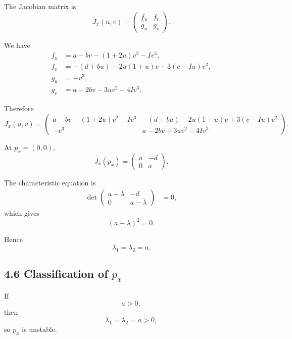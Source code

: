 \documentclass[11pt,a4paper]{article}
\begin{document}
The Jacobian matrix is
\begin{equation}
J_x(u,v)
=
\begin{pmatrix}
f_u & f_v\\
g_u & g_v
\end{pmatrix}.
\end{equation}

We have
\begin{align}
f_u
&=
a-bv-(1+2u)v^2-Iv^3,
\\
f_v
&=
-(d+bu)-2u(1+u)v+3(c-Iu)v^2,
\\
g_u
&=
-v^3,
\\
g_v
&=
a-2bv-3uv^2-4Iv^3.
\end{align}

Therefore
\begin{equation}
\boxed{
J_x(u,v)
=
\begin{pmatrix}
a-bv-(1+2u)v^2-Iv^3
&
-(d+bu)-2u(1+u)v+3(c-Iu)v^2
\\[2mm]
-v^3
&
a-2bv-3uv^2-4Iv^3
\end{pmatrix}.
}
\tag{25}
\end{equation}

At $p_x=(0,0)$,
\begin{equation}
\boxed{
J_x(p_x)
=
\begin{pmatrix}
a & -d\\
0 & a
\end{pmatrix}.
}
\tag{26}
\end{equation}

The characteristic equation is
\begin{align}
\det
\begin{pmatrix}
a-\lambda & -d\\
0 & a-\lambda
\end{pmatrix}
&=0,
\end{align}
which gives
\begin{equation}
(a-\lambda)^2=0.
\end{equation}

Hence
\begin{equation}
\boxed{
\lambda_1=\lambda_2=a.
}
\tag{27}
\end{equation}

\subsection{4.6 Classification of $p_x$}

If
\begin{equation}
a>0,
\end{equation}
then
\begin{equation}
\lambda_1=\lambda_2=a>0,
\end{equation}
so $p_x$ is unstable.
\end{document}
